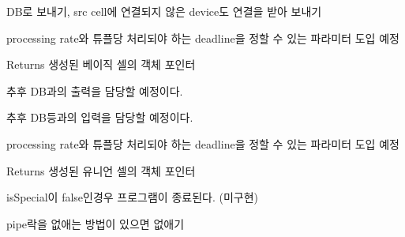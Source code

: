 
\begin{DoxyRefList}
\item[\label{todo__todo000001}%
\hypertarget{todo__todo000001}{}%
Class \hyperlink{classDESTCELL}{D\+E\+S\+T\+C\+E\+L\+L} ]D\+B로 보내기, src cell에 연결되지 않은 device도 연결을 받아 보내기  
\item[\label{todo__todo000002}%
\hypertarget{todo__todo000002}{}%
Member \hyperlink{classFACTORYBUILDER_ad29f6bcb828945d37bee154b247ded10}{F\+A\+C\+T\+O\+R\+Y\+B\+U\+I\+L\+D\+E\+R\+:\+:make\+B\+A\+S\+I\+C\+C\+E\+L\+L} (int count, F\+U\+N\+C func, \hyperlink{classSTREAMFACTORY}{S\+T\+R\+E\+A\+M\+F\+A\+C\+T\+O\+R\+Y} $\ast$streamfactory)]processing rate와 튜플당 처리되야 하는 deadline을 정할 수 있는 파라미터 도입 예정 \begin{DoxyReturn}{Returns}
생성된 베이직 셀의 객체 포인터  
\end{DoxyReturn}

\item[\label{todo__todo000005}%
\hypertarget{todo__todo000005}{}%
Member \hyperlink{classFACTORYBUILDER_ab56a2ef6e49fa0370c3b1138e2350d01}{F\+A\+C\+T\+O\+R\+Y\+B\+U\+I\+L\+D\+E\+R\+:\+:make\+D\+E\+S\+T\+C\+E\+L\+L} (\hyperlink{classSTREAMFACTORY}{S\+T\+R\+E\+A\+M\+F\+A\+C\+T\+O\+R\+Y} $\ast$streamfactory)]추후 D\+B과의 출력을 담당할 예정이다.  
\item[\label{todo__todo000004}%
\hypertarget{todo__todo000004}{}%
Member \hyperlink{classFACTORYBUILDER_a1378efcb11e24157cfbdb325e9cbaf2b}{F\+A\+C\+T\+O\+R\+Y\+B\+U\+I\+L\+D\+E\+R\+:\+:make\+S\+R\+C\+C\+E\+L\+L} (int recvport, \hyperlink{classSTREAMFACTORY}{S\+T\+R\+E\+A\+M\+F\+A\+C\+T\+O\+R\+Y} $\ast$streamfactory)]추후 D\+B등과의 입력을 담당할 예정이다.  
\item[\label{todo__todo000003}%
\hypertarget{todo__todo000003}{}%
Member \hyperlink{classFACTORYBUILDER_a485976fa00bdee0a822ef949c3db31e0}{F\+A\+C\+T\+O\+R\+Y\+B\+U\+I\+L\+D\+E\+R\+:\+:make\+U\+N\+I\+O\+N\+C\+E\+L\+L} (int cellid, int count, \hyperlink{classSTREAMFACTORY}{S\+T\+R\+E\+A\+M\+F\+A\+C\+T\+O\+R\+Y} $\ast$streamfactory, int policy)]processing rate와 튜플당 처리되야 하는 deadline을 정할 수 있는 파라미터 도입 예정 \begin{DoxyReturn}{Returns}
생성된 유니언 셀의 객체 포인터  
\end{DoxyReturn}

\item[\label{todo__todo000006}%
\hypertarget{todo__todo000006}{}%
Member \hyperlink{classTUPLE_ac92a492d3f8a793fe02fe364244c34af}{T\+U\+P\+L\+E\+:\+:T\+U\+P\+L\+E} (char $\ast$packet, bool is\+Special)]is\+Special이 false인경우 프로그램이 종료된다. (미구현)  
\item[\label{todo__todo000007}%
\hypertarget{todo__todo000007}{}%
Member \hyperlink{classUNIONCELL_a42d955ed8ce559f41bd4837eda14a4ee}{U\+N\+I\+O\+N\+C\+E\+L\+L\+:\+:getpipelock} ()]pipe락을 없애는 방법이 있으면 없애기 
\end{DoxyRefList}